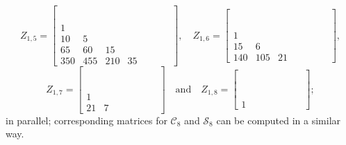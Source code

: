 \begin{example}
\begin{displaymath}
\end{displaymath}
\begin{displaymath}
Z_{1,5} = \left[\begin{matrix} &  &  &  &  &  &  & \\ &  &  &  &  &  &  & \\ &  &  &  &  &  &  & \\ &  &  &  &  &  &  & \\1 &  &  &  &  &  &  & \\10 & 5 &  &  &  &  &  & \\65 & 60 & 15 &  &  &  &  & \\350 & 455 & 210 & 35 &  &  &  & \end{matrix}\right], \quad Z_{1,6} = \left[\begin{matrix} &  &  &  &  &  &  & \\ &  &  &  &  &  &  & \\ &  &  &  &  &  &  & \\ &  &  &  &  &  &  & \\ &  &  &  &  &  &  & \\1 &  &  &  &  &  &  & \\15 & 6 &  &  &  &  &  & \\140 & 105 & 21 &  &  &  &  & \end{matrix}\right],
\end{displaymath}
\begin{displaymath}
Z_{1,7} = \left[\begin{matrix} &  &  &  &  &  &  & \\ &  &  &  &  &  &  & \\ &  &  &  &  &  &  & \\ &  &  &  &  &  &  & \\ &  &  &  &  &  &  & \\ &  &  &  &  &  &  & \\1 &  &  &  &  &  &  & \\21 & 7 &  &  &  &  &  & \end{matrix}\right]
\quad\text{and}\quad Z_{1,8} = \left[\begin{matrix} &  &  &  &  &  &  & \\ &  &  &  &  &  &  & \\ &  &  &  &  &  &  & \\ &  &  &  &  &  &  & \\ &  &  &  &  &  &  & \\ &  &  &  &  &  &  & \\ &  &  &  &  &  &  & \\1 &  &  &  &  &  &  & \end{matrix}\right];
\end{displaymath}
in parallel; corresponding matrices for $\mathcal{C}_{8}$ and $\mathcal{S}_{8}$
can be computed in a similar way.
\end{example}

